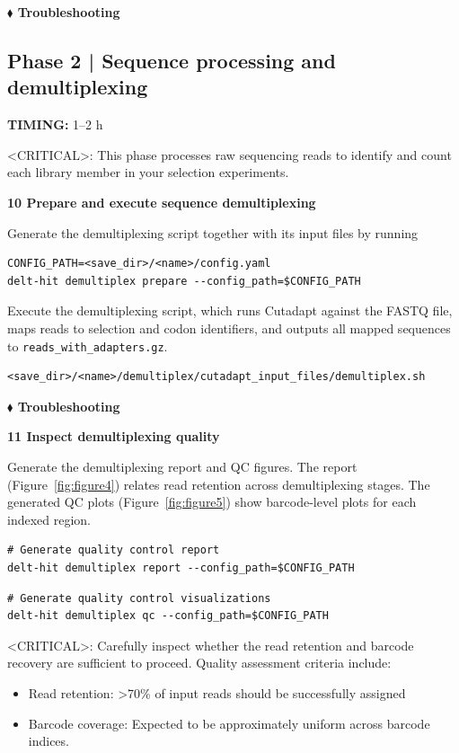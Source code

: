 \documentclass[pdflatex,sn-nature]{sn-jnl}
\newcommand{\protocolstep}[2]{\par\medskip\noindent\textbf{#1 \textbar{} #2}\par}
\begin{document}
\textbf{$\blacklozenge$ Troubleshooting}

\subsection{Phase 2 | Sequence processing and demultiplexing}

\textbf{TIMING:} 1--2 h

<CRITICAL>: This phase processes raw sequencing reads to identify and count each library member in your selection experiments. 

\protocolstep{10}{Prepare and execute sequence demultiplexing}
Generate the demultiplexing script together with its input files by running

\begin{lstlisting}
CONFIG_PATH=<save_dir>/<name>/config.yaml
delt-hit demultiplex prepare --config_path=$CONFIG_PATH
\end{lstlisting}

Execute the demultiplexing script, which runs Cutadapt against the FASTQ file, maps reads to selection and codon identifiers, and outputs all mapped sequences to \texttt{reads\_with\_adapters.gz}.

\begin{lstlisting}
<save_dir>/<name>/demultiplex/cutadapt_input_files/demultiplex.sh
\end{lstlisting}

\textbf{$\blacklozenge$ Troubleshooting}

\protocolstep{11}{Inspect demultiplexing quality}
Generate the demultiplexing report and QC figures. The report (Figure~\ref{fig:figure4}) relates read retention across demultiplexing stages. The generated QC plots (Figure~\ref{fig:figure5}) show barcode-level plots for each indexed region.

\begin{lstlisting}
# Generate quality control report
delt-hit demultiplex report --config_path=$CONFIG_PATH
\end{lstlisting}

\begin{lstlisting}
# Generate quality control visualizations
delt-hit demultiplex qc --config_path=$CONFIG_PATH
\end{lstlisting}

<CRITICAL>: Carefully inspect whether the read retention and barcode recovery are sufficient to proceed. Quality assessment criteria include:

\begin{itemize}
  \item Read retention: \textgreater{}70\% of input reads should be successfully assigned
  \item Barcode coverage: Expected to be approximately uniform across barcode indices.
\end{itemize}
\end{document}
